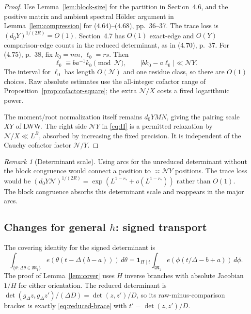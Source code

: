 \documentclass[11pt]{article}
\theoremstyle{definition}
\newcommand{\ind}{\mathbf 1}
\newcommand{\GN}{\mathcal N}
\newcommand{\Mone}{\mathfrak M_1}
\theoremstyle{remark}
\newtheorem{remark}[theorem]{Remark}
\numberwithin{equation}{section}
\begin{document}
\begin{proof}
Use Lemma~\ref{lem:block-size} for the partition in Section~4.6,
and the positive matrix and ambient spectral H\"older argument in
Lemma~\ref{lem:compression} for (4.64)--(4.68), pp.~36--37.
The trace loss is $(d_0Y)^{1/(2R)}=O(1)$.
Section~4.7 has $O(1)$ exact-edge and $O(Y)$ comparison-edge counts
in the reduced determinant, as in (4.70), p.~37.
For (4.75), p.~38, fix $k_0=mn$, $\ell_0=rs$.
Then
\begin{equation}\label{eq:comparison-count}
 \ell_0\equiv ba^{-1}k_0\pmod{\GN},\qquad
 |bk_0-a\ell_0|\ll\GN Y.
\end{equation}
The interval for $\ell_0$ has length $O(\GN)$ and one residue
class, so there are $O(1)$ choices. Raw absolute estimates use the
all-integer cofactor range of Proposition~\ref{prop:cofactor-square};
the extra $\GN/X$ costs a fixed logarithmic power.

The moment/root normalization itself remains $d_0YMN$, giving the
pairing scale $XY$ of LWW. The right side $\GN Y$ in
\eqref{eq:II} is a permitted relaxation by
$\GN/X\ll L^B$, absorbed by increasing the fixed precision.
It is independent of the Cauchy cofactor factor $\GN/Y$.
\end{proof}
\begin{remark}[Determinant scale]\label{rem:det-scale}
Using arcs for the unreduced determinant without the block
congruence would connect a position to $\asymp\GN Y$ positions.
The trace loss would be
$(d_0Y\GN)^{1/(2R)}=\exp(L^{1-r_*}+o(L^{1-r_*}))$ rather than $O(1)$.
The block congruence absorbs this determinant scale and reappears
in the major arcs.
\end{remark}

\subsection{Changes for general \texorpdfstring{$h$}{h}: signed transport}\label{subsec:affine-transport}
The covering identity for the signed determinant is
\begin{equation}\label{v2:5-1}
 \int_{\{\theta:\Delta\theta\in\Mone\}}
 e(\theta(t-\Delta(b-a)))\,d\theta
 =\ind_{H\mid t}\int_{\Mone}e(\phi(t/\Delta-b+a))\,d\phi.
\end{equation}
The proof of Lemma~\ref{lem:cover} uses $H$ inverse branches with
absolute Jacobian $1/H$ for either orientation. The reduced
determinant is
$\det(g_\Delta z,g_\Delta z')/(\Delta D)=\det(z,z')/D$,
so its raw-minus-comparison bracket is exactly
\eqref{eq:reduced-brace} with $t'=\det(z,z')/D$.
\end{document}
